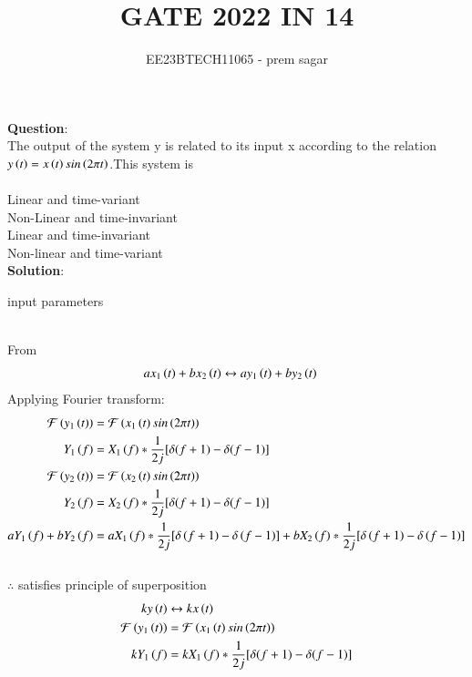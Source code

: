 \documentclass[journal,12pt,twocolumn]{IEEEtran}
\theoremstyle{remark}
\begin{document}

\vspace{3cm}

\title{GATE 2022 IN 14}
\author{EE23BTECH11065 - prem sagar}
\maketitle
\newpage

\bigskip

\renewcommand{\thefigure}{\theenumi}
\renewcommand{\thetable}{\theenumi}
\textbf{Question}:
\\The output of the system y is related to its input x according to the relation $y\left(t\right)=x\left(t\right)sin\left(2\pi t\right)$.This system is 
\\\\ Linear and time-variant
\\ Non-Linear and time-invariant
\\ Linear and time-invariant
\\ Non-linear and time-variant
\\\textbf{Solution}:
\begin{table}[!ht]
\def\arraystretch{1.5}
   \centering
    \renewcommand\thetable{1}
      
    \caption{input parameters}
    \label{tab:IN 14}
 \end{table}
\\ From 
\\\begin{align}
ax_1\left(t\right)+bx_2\left(t\right)&\leftrightarrow ay_1\left(t\right)+by_2\left(t\right)
\end{align}
Applying Fourier transform:
\begin{align}
\mathcal{F}\left(y_1\left(t\right)\right)&=\mathcal{F}\left(x_1\left(t\right)sin\left(2\pi t\right)\right)
\\Y_1\left(f\right)&=X_1\left(f\right)*\frac{1}{2j}[\delta(f+1)-\delta(f-1)]
\\\mathcal{F}\left(y_2\left(t\right)\right)&=\mathcal{F}\left(x_2\left(t\right)sin\left(2\pi t\right)\right)
\\Y_2\left(f\right)&=X_2\left(f\right)*\frac{1}{2j}[\delta(f+1)-\delta(f-1)]
\\aY_1\left(f\right)+bY_2\left(f\right)&=aX_1\left(f\right)*\frac{1}{2j}[\delta\left(f+1\right)-\delta\left(f-1\right)]+bX_2\left(f\right)*\frac{1}{2j}[\delta\left(f+1\right)-\delta\left(f-1\right)]
\end{align}
\\$\therefore$ satisfies principle of superposition
\begin{align}
ky\left(t\right)&\leftrightarrow kx\left(t\right)
\\\mathcal{F}\left(y_1\left(t\right)\right)&=\mathcal{F}\left(x_1\left(t\right)sin\left(2\pi t\right)\right)
\\kY_1\left(f\right)&=kX_1\left(f\right)*\frac{1}{2j}[\delta(f+1)-\delta(f-1)]
\end{align}
\end{document}
